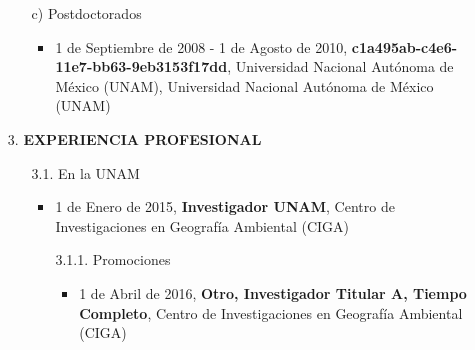 \documentclass[12pt]{report}
\begin{document}
\begin{enumerate}
{\begin{enumerate}
{\begin{itemize}[label=\FilledSmallSquare]
\begin{itemize}
                                  \end{itemize}



                                      \item[c)] Postdoctorados
                                          \begin{itemize}

                                          \item 1 de Septiembre de 2008 - 1 de Agosto de 2010,\textbf{ c1a495ab-c4e6-11e7-bb63-9eb3153f17dd}, Universidad Nacional Autónoma de México (UNAM), Universidad Nacional Autónoma de México (UNAM)

                                  \end{itemize}


                          \end{itemize}
                        }



            \end{enumerate}
            }


            \vspace{0.5cm}
            \item[3.] \textbf{EXPERIENCIA PROFESIONAL}
                \begin{enumerate}


                        \item[3.1.] En la UNAM

                                \begin{itemize}

                                        \item{ 1 de Enero de 2015,\textbf{ Investigador UNAM}, Centro de Investigaciones en Geografía Ambiental (CIGA)}

                                \end{itemize}



                            \begin{itemize}
                                \item[3.1.1.] Promociones
                                    \begin{itemize}

                                            \item{ 1 de Abril de 2016,\textbf{ Otro, Investigador Titular A, Tiempo Completo}, Centro de Investigaciones en Geografía Ambiental (CIGA)}


\end{itemize}
\end{itemize}
\end{enumerate}
\end{enumerate}
\end{document}
